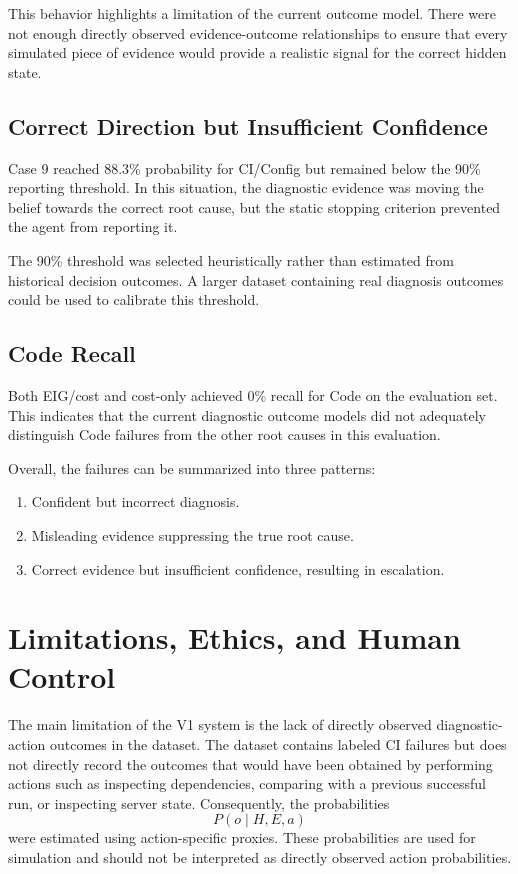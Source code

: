 \documentclass{article}
\begin{document}
This behavior highlights a limitation of the current outcome model. There were not enough directly observed evidence-outcome relationships to ensure that every simulated piece of evidence would provide a realistic signal for the correct hidden state.

\subsection{Correct Direction but Insufficient Confidence}

Case 9 reached 88.3\% probability for CI/Config but remained below the 90\% reporting threshold. In this situation, the diagnostic evidence was moving the belief towards the correct root cause, but the static stopping criterion prevented the agent from reporting it.

The 90\% threshold was selected heuristically rather than estimated from historical decision outcomes. A larger dataset containing real diagnosis outcomes could be used to calibrate this threshold.

\subsection{Code Recall}

Both EIG/cost and cost-only achieved 0\% recall for Code on the evaluation set. This indicates that the current diagnostic outcome models did not adequately distinguish Code failures from the other root causes in this evaluation.

Overall, the failures can be summarized into three patterns:
\begin{enumerate}
    \item Confident but incorrect diagnosis.
    \item Misleading evidence suppressing the true root cause.
    \item Correct evidence but insufficient confidence, resulting in escalation.
\end{enumerate}

\section{Limitations, Ethics, and Human Control}

The main limitation of the V1 system is the lack of directly observed diagnostic-action outcomes in the dataset. The dataset contains labeled CI failures but does not directly record the outcomes that would have been obtained by performing actions such as inspecting dependencies, comparing with a previous successful run, or inspecting server state. Consequently, the probabilities
\[
P(o\mid H,E,a)
\]
were estimated using action-specific proxies. These probabilities are used for simulation and should not be interpreted as directly observed action probabilities.
\end{document}
